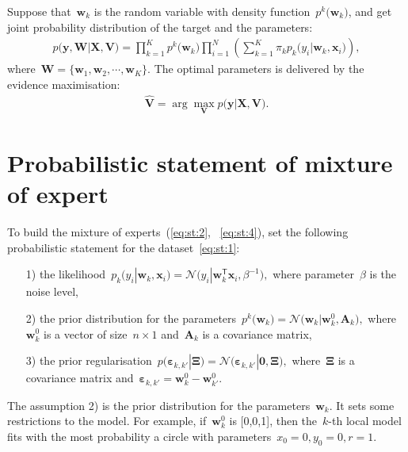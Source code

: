 \documentclass[12pt, twoside]{article}
\numberwithin{equation}{section}
\begin{document}
Suppose that~$\textbf{w}_k$ is the random variable with density function~$p^{k}\bigr(\mathbf{w}_k\bigr)$, and get joint probability distribution of the target and the parameters:
\[
\label{eq:st:4}
\begin{aligned}
p\bigr(\mathbf{y}, \mathbf{W}|\mathbf{X}, \mathbf{V}\bigr) = \prod_{k=1}^{K}p^{k}\bigr(\mathbf{w}_k\bigr)\prod_{i=1}^{N}\left(\sum_{k=1}^{K}\pi_{k}p_{k}\bigr(y_i|\mathbf{w}_k, \mathbf{x}_i\bigr)\right),
\end{aligned}
\]
where~$\mathbf{W} = \bigr\{\mathbf{w}_1, \mathbf{w}_2, \cdots, \mathbf{w}_K\bigr\}.$
The optimal parameters is delivered by the evidence maximisation:
\[
\label{eq:st:5}
\begin{aligned}
\hat{\mathbf{V}} = \arg\max_{\mathbf{V}} p\bigr(\mathbf{y}|\mathbf{X}, \mathbf{V}\bigr).
\end{aligned}
\]

\section{Probabilistic statement of mixture of expert}
To build the mixture of experts~(\ref{eq:st:2}, ~\ref{eq:st:4}), set the following probabilistic statement for the dataset~\eqref{eq:st:1}:

\begin{enumerate}
	\item[1)] the likelihood~$p_{k}\bigr(y_{i}|\mathbf{w}_{k}, \mathbf{x}_{i}\bigr) = \mathcal{N}\bigr(y_{i}|\mathbf{w}_{k}^{\mathsf{T}}\mathbf{x}_{i}, \beta^{-1}\bigr),$ where parameter~$\beta$ is the noise level,
	\item[2)] the prior distribution for the parameters~$p^{k}\bigr(\mathbf{w}_{k}\bigr) = \mathcal{N}\bigr(\mathbf{w}_{k}|\mathbf{w}^{0}_{k}, \mathbf{A}_{k}\bigr),$ where~$\mathbf{w}^{0}_{k}$ is a vector of size~$n\times1$ and~$\mathbf{A}_{k}$ is a covariance matrix,
	\item[3)] the prior regularisation~$p\bigr(\bm{\varepsilon}_{k,k'}|\bm{\Xi}\bigr) = \mathcal{N}\bigr(\bm{\varepsilon}_{k,k'}|\mathbf{0},  \bm{\Xi}\bigr),$ where~$\bm{\Xi}$ is a covariance matrix and~$\bm{\varepsilon}_{k,k'} = \mathbf{w}_{k}^{0}-\mathbf{w}_{k'}^{0}.$
\end{enumerate}
The assumption 2) is the prior distribution for the parameters~$\textbf{w}_k$. It sets some restrictions to the model. For example, if~$\textbf{w}_k^{0}$ is [0,0,1], then the~$k$-th local model fits with the most probability a circle with parameters~$x_0=0, y_0=0, r=1$.
\end{document}
